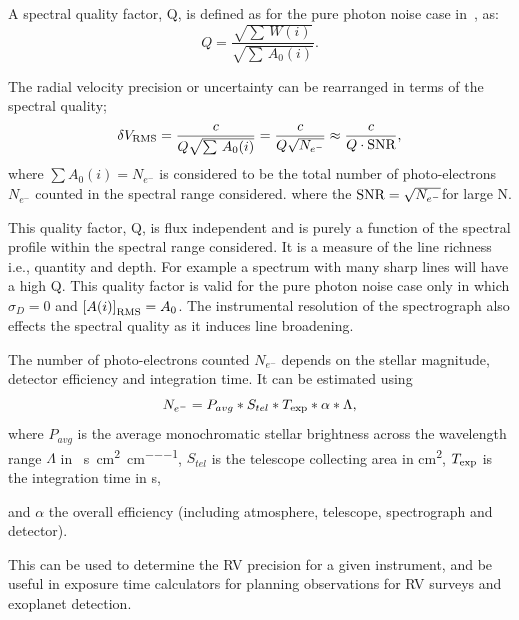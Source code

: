 A spectral quality factor, Q, is defined as for the pure photon noise case in~\cite{connes_absolute_1985, connes_demonstration_1996}, as:
\begin{equation}
Q = \frac{\sqrt{\sum{\,W(i)}}}{\sqrt{\sum{\,A_0(i)}}}.
\end{equation}

The radial velocity precision or uncertainty can be rearranged in terms of the spectral quality;
\begin{equation}
    \delta V_{\textrm{RMS}} = \frac{c}{Q \sqrt{\sum {\,A_0(i)}}} = \frac{c}{Q \sqrt{{N}_{{e}^{-}}}} \approx \frac{c}{Q \cdot \textrm{SNR}{}},  \label{eqn:snr_relation}
\end{equation}
where \(\sum A_0(i) = {N}_{{e}^{-}}\) is considered to be the total number of photo-electrons \({N}_{{e}^{-}}\) counted in the spectral range considered.
where the \({\textrm{SNR}{}}=\sqrt{N_{{e}^{-}}}\)for large N.


This quality factor, Q, is flux independent and is purely a function of the spectral profile within the spectral range considered.
It is a measure of the line richness i.e., quantity and depth.
For example a spectrum with many sharp lines will have a high Q.
This quality factor is valid for the pure photon noise case only in which \(\sigma_{D} =0\) and \({[A(i)]}_{\textrm{RMS}} = A_0\).
The instrumental resolution of the spectrograph also effects the spectral quality as it induces line broadening.

The number of photo-electrons counted \(N_{{e}^{-}}\) depends on the stellar magnitude, detector efficiency and integration time.
It can be estimated using
\begin{equation}
     N_{{e}^{-}} = P_{avg} * S_{tel} * T_{\textrm{exp}} * \alpha* \Lambda,
\end{equation}
where \(P_{avg}\) is the average monochromatic stellar brightness
across the wavelength range \(\Lambda\) in \si{\photons\per\second\per\centi\metre\squared\per\centi\metre},
\(S_{tel}\) is the telescope collecting area in \si{\centi\metre\squared},
\(T_{\textrm{exp}}\) is the integration time in \si{\second},

and \(\alpha\) the overall efficiency (including atmosphere, telescope, spectrograph and detector).

This can be used to determine the {RV} precision for a given instrument, and be useful in exposure time calculators for planning observations for {RV} surveys and exoplanet detection.

